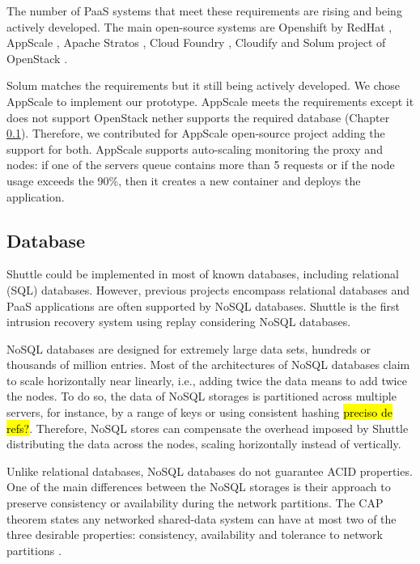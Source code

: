 The number of \acf{PaaS} systems that meet these requirements are rising and being actively developed. The main open-source systems are Openshift by RedHat \cite{OpenShift}, AppScale \cite{Appscale}, Apache Stratos \cite{ApacheStratos}, Cloud Foundry \cite{Cloudfoundry}, Cloudify \cite{cloudify} and Solum project of OpenStack \cite{solum}.  

 Solum matches the requirements but it still being actively developed. We chose AppScale \cite{Appscale} to implement our prototype. AppScale meets the requirements except it does not support OpenStack nether supports the required database (Chapter \ref{sec:impl:database_options}).  Therefore, we contributed for AppScale open-source project adding the support for both. AppScale supports auto-scaling monitoring the proxy and nodes: if one of the servers queue contains more than 5 requests or if the node usage exceeds the 90\%, then it creates a new container and deploys the application.

\subsection{Database}\label{sec:impl:database_options}
Shuttle could be implemented in most of known databases, including relational (\ac{SQL}) databases. However, previous projects encompass relational databases \cite{warp,goel} and \ac{PaaS} applications are often supported by \acs{NoSQL} databases. Shuttle is the first intrusion recovery system using replay considering \acs{NoSQL} databases.

\acs{NoSQL} databases are designed for extremely large data sets, hundreds or thousands of million entries. Most of the architectures of \acs{NoSQL} databases claim to scale horizontally near linearly, i.e., adding twice the data means to add twice the nodes. To do so, the data of \acs{NoSQL} storages is partitioned across multiple servers, for instance, by a range of keys or using consistent hashing \hl{preciso de refs?}. Therefore, \acs{NoSQL} stores can compensate the overhead imposed by Shuttle distributing the data across the nodes, scaling horizontally instead of vertically. 


Unlike relational databases, \acs{NoSQL} databases do not guarantee \acf{ACID} properties. One of the main differences between the \acs{NoSQL} storages is their approach to preserve consistency or availability during the network partitions. The \acs{CAP} theorem states any networked shared-data system can have at most two of the three desirable properties: consistency, availability and tolerance to network partitions \cite{brewer2012cap}.


